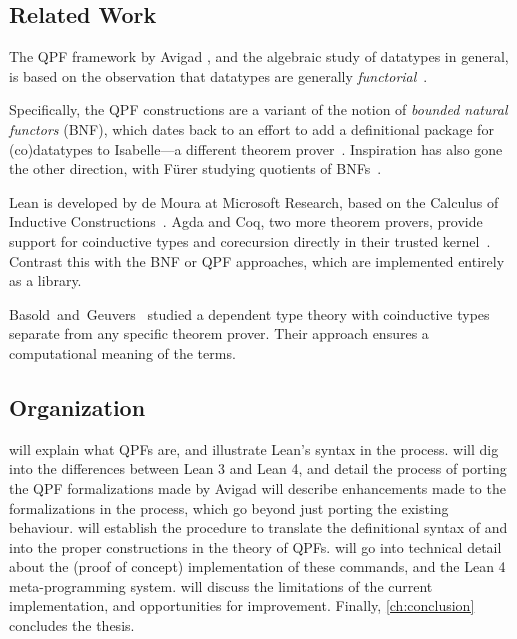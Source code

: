\subsection*{Related Work}
The QPF framework by Avigad \etal{}, and the algebraic study of datatypes in general, is based on the observation that datatypes are generally \emph{functorial}~\cite{avigadDataTypesQuotients2019}.

Specifically, the QPF constructions are a variant of the notion of \emph{bounded natural functors} (BNF), 
which dates back to an effort to add a definitional package for (co)datatypes to Isabelle---a different theorem prover~\cite{biendarraDefiningCoDatatypes,traytelCategoryTheoryBased}.
Inspiration has also gone the other direction, with Fürer \etal{} studying quotients of BNFs~\cite{furerQuotientsBoundedNatural2022}.


Lean is developed by de Moura \etal{} at Microsoft Research, based on the Calculus of Inductive Constructions~\cite{demouraLeanTheoremProver2015,coquandMetamathematicalInvestigationsCalculus1989}.
Agda and Coq, two more theorem provers, provide support
for coinductive types and corecursion directly in their trusted kernel~\cite{gimenezApplicationCoinductiveTypes1996,gimenezTutorialRecursiveTypes1998}. Contrast this with the BNF or QPF approaches, which are implemented entirely as a
library.

Basold~and~Geuvers~\cite{basoldMixedInductiveCoinductiveReasoning2018, basoldTypeTheoryBased2016}
studied a dependent type theory with coinductive types separate from any specific theorem prover.
Their approach ensures a computational meaning of the terms.




\subsection*{Organization}
 will explain what QPFs are, and illustrate Lean's syntax in the process.
 will dig into the differences between Lean 3 and Lean 4, and detail the process of porting the QPF formalizations made by Avigad \etal{}
 will describe enhancements made to the formalizations in the process, which go beyond just porting the existing behaviour.
 will establish the procedure to translate the definitional syntax of \data{} and \codata{} into the proper constructions in the theory of QPFs.
 will go into technical detail about the (proof of concept)
implementation of these commands, and the Lean 4 meta-programming system.
 will discuss the limitations of the current implementation, and opportunities for improvement.
Finally, \cref{ch:conclusion} concludes the thesis.

